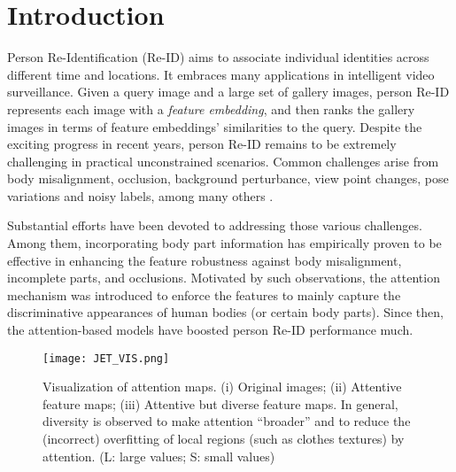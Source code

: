 \documentclass[10pt,twocolumn]{article}
\begin{document}
\renewcommand{\thefootnote}{\fnsymbol{footnote}}



\section{Introduction}

Person Re-Identification (Re-ID) aims to associate individual identities across different time and locations. It embraces many applications in intelligent video surveillance. Given a query image and a large set of gallery images, person Re-ID represents each image with a \textit{feature embedding}, and then ranks the gallery images in terms of feature embeddings' similarities to the query. Despite the exciting progress in recent years, person Re-ID remains to be extremely challenging in practical unconstrained scenarios. Common challenges arise from body misalignment, occlusion, background perturbance, view point changes, pose variations and noisy labels, among many others \cite{Wei_2018_CVPR}.






Substantial efforts have been devoted to addressing those various challenges. Among them, incorporating body part information \cite{gray2008viewpoint, prosser2010person, cheng2016person, su2017pose, zheng2017pose} has empirically proven to be effective in enhancing the feature robustness against body misalignment, incomplete parts, and occlusions. Motivated by such observations, the attention mechanism \cite{vaswani2017attention} was introduced to enforce the features to mainly capture the discriminative appearances of human bodies (or certain body parts). Since then, the attention-based models \cite{zhao2017deeply, yao2017deep, si2018dual, xu2018attention, li2018harmonious} have boosted person Re-ID performance much. 

\begin{figure}[t]
\begin{center}
   \texttt{[image: JET\_VIS.png]}
\end{center}
   \caption{Visualization of attention maps. (i) Original images; (ii) Attentive feature maps; (iii) Attentive but diverse feature maps. In general, diversity is observed to make attention ``broader'' and to reduce the (incorrect) overfitting of local regions (such as clothes textures) by attention. (L: large values; S: small values)}
\label{fig:visfintro}
\vspace{-5mm}
\end{figure}
\end{document}
